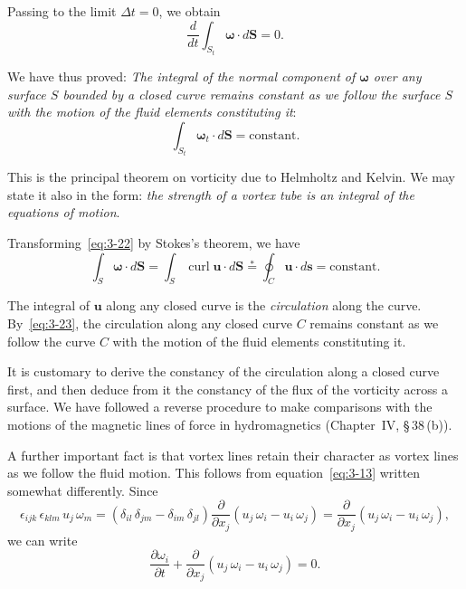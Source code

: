 Passing to the limit $\Delta t = 0$, we obtain
\begin{equation}\label{eq:3-21}
\frac{d}{dt}\int_{S_t}\boldsymbol{\omega}\cdot d\mathbf{S} = 0.
\end{equation}

We have thus proved: \emph{The integral of the normal component of\/ $\boldsymbol{\omega}$ over any surface $S$ bounded by a closed curve remains constant as we follow the surface $S$ with the motion of the fluid elements constituting it}:
\begin{equation}\label{eq:3-22}
\int_{S_t}\boldsymbol{\omega}_t\cdot d\mathbf{S} = \text{constant}.
\end{equation}

This is the principal theorem on vorticity due to Helmholtz and Kelvin. We may state it also in the form: \emph{the strength of a vortex tube is an integral of the equations of motion}.

Transforming~\eqref{eq:3-22} by Stokes's theorem, we have
\begin{equation}\label{eq:3-23}
\int_S \boldsymbol{\omega}\cdot d\mathbf{S} = \int_S \operatorname{curl}\mathbf{u}\cdot d\mathbf{S} \stackrel{*}{=} \oint_C \mathbf{u}\cdot d\mathbf{s} = \text{constant}.
\end{equation}

The integral of $\mathbf{u}$ along any closed curve is the \emph{circulation} along the curve. By~\eqref{eq:3-23}, the circulation along any closed curve $C$ remains constant as we follow the curve $C$ with the motion of the fluid elements constituting it.

It is customary to derive the constancy of the circulation along a closed curve first, and then deduce from it the constancy of the flux of the vorticity across a surface. We have followed a reverse procedure to make comparisons with the motions of the magnetic lines of force in hydromagnetics (Chapter~IV, \S\,38\,(b)).

A further important fact is that vortex lines retain their character as vortex lines as we follow the fluid motion. This follows from equation~\eqref{eq:3-13} written somewhat differently. Since
\begin{equation}\label{eq:3-24}
\epsilon_{ijk}\,\epsilon_{klm}\, u_j\, \omega_m = (\delta_{il}\,\delta_{jm} - \delta_{im}\,\delta_{jl})\frac{\partial}{\partial x_j}(u_j\,\omega_i - u_i\,\omega_j) = \frac{\partial}{\partial x_j}(u_j\,\omega_i - u_i\,\omega_j),
\end{equation}
we can write
\begin{equation}\label{eq:3-25}
\frac{\partial\omega_i}{\partial t} + \frac{\partial}{\partial x_j}(u_j\,\omega_i - u_i\,\omega_j) = 0.
\end{equation}

